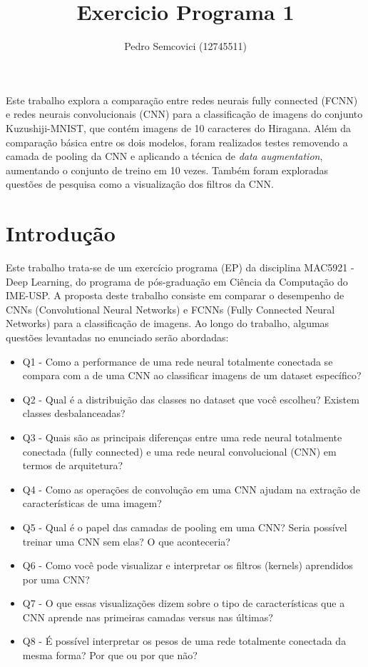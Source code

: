\documentclass[12pt]{article}
\title{Exercicio Programa 1}
\author{Pedro Semcovici (12745511) }
\begin{document}
 

\maketitle
     
\begin{resumo} 
Este trabalho explora a comparação entre redes neurais fully connected (FCNN) e redes neurais convolucionais (CNN) para a classificação de imagens do conjunto Kuzushiji-MNIST, que contém imagens de 10 caracteres do Hiragana. Além da comparação básica entre os dois modelos, foram realizados testes removendo a camada de pooling da CNN e aplicando a técnica de \textit{data augmentation}, aumentando o conjunto de treino em 10 vezes. Também foram exploradas questões de pesquisa como a visualização dos filtros da CNN.
\end{resumo}


\section{Introdução} Este trabalho trata-se de um exercício programa (EP) da disciplina MAC5921 - Deep Learning, do programa de pós-graduação em Ciência da Computação do IME-USP. A proposta deste trabalho consiste em comparar o desempenho de CNNs (Convolutional Neural Networks) e FCNNs (Fully Connected Neural Networks) para a classificação de imagens. Ao longo do trabalho, algumas questões levantadas no enunciado serão abordadas:
\begin{itemize}
  \item Q1 - Como a performance de uma rede neural totalmente conectada se compara com a de uma CNN ao classificar imagens de um dataset específico?
  \item Q2 - Qual é a distribuição das classes no dataset que você escolheu? Existem classes desbalanceadas?
  \item Q3 - Quais são as principais diferenças entre uma rede neural totalmente conectada (fully connected) e uma rede neural convolucional (CNN) em termos de arquitetura?
  \item Q4 - Como as operações de convolução em uma CNN ajudam na extração de características de uma imagem?
  \item Q5 - Qual é o papel das camadas de pooling em uma CNN? Seria possível treinar uma CNN sem elas? O que aconteceria?
  \item Q6 - Como você pode visualizar e interpretar os filtros (kernels) aprendidos por uma CNN?
  \item Q7 - O que essas visualizações dizem sobre o tipo de características que a CNN aprende nas primeiras camadas versus nas últimas?
  \item Q8 - É possível interpretar os pesos de uma rede totalmente conectada da mesma forma? Por que ou por que não?
\end{itemize}
\end{document}
